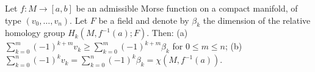 Let $f: M \to [a, b]$ be an admissible Morse function on a compact manifold, of type $(v_0, \ldots, v_n)$. Let $F$ be a field and denote by $\beta_k$ the dimension of the relative homology group $H_k(M, f^{-1}(a); F)$. Then:
(a) $\sum_{k=0}^{m} (-1)^{k+m} v_k \geqslant \sum_{k=0}^{m} (-1)^{k+m} \beta_k$ for $0 \leqslant m \leqslant n$;
(b) $\sum_{k=0}^{n} (-1)^k v_k = \sum_{k=0}^{n} (-1)^k \beta_k = \chi(M, f^{-1}(a))$.

